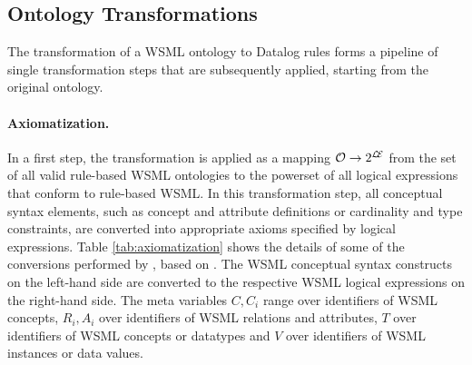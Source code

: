 \def\mvexpr{\ensuremath{E}}
\def\mvex{\ensuremath{E_x}}
\def\mvey{\ensuremath{E_y}}
\def\mvez{\ensuremath{E_z}}
\def\mve1{\ensuremath{E_1}}
\def\mven{\ensuremath{E_n}}

\subsection{Ontology Transformations}
The transformation of a WSML ontology to Datalog rules forms a
pipeline of single transformation steps that are subsequently
applied, starting from the original ontology.

\paragraph{Axiomatization.} In a first step, the transformation
\transax is applied as a mapping $\mathcal{O} \rightarrow 2^{\mathcal{L\!E}}$
from the set of all valid rule-based WSML ontologies to the
powerset of all logical expressions that conform to rule-based
WSML. In this transformation step, all conceptual syntax elements,
such as concept and attribute definitions or cardinality and type
constraints, are converted into appropriate axioms specified by
logical expressions. Table \ref{tab:axiomatization} shows the
details of some of the conversions performed by \transax, based on
\cite{wsml-spec}. The WSML conceptual syntax constructs on the
left-hand side are converted to the respective WSML logical
expressions on the right-hand side. The meta variables $C,C_i$
range over identifiers of WSML concepts, $R_i,A_i$ over
identifiers of WSML relations and attributes, $T$ over identifiers
of WSML concepts or datatypes and $V$ over identifiers of WSML
instances or data values.


